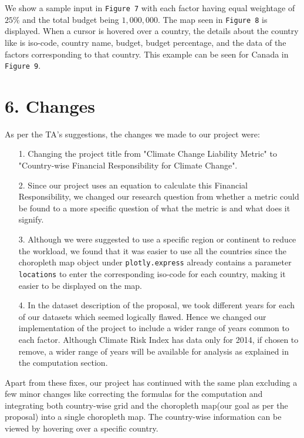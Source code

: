 \documentclass[fontsize=11pt]{article}
\begin{document}
    We show a sample input in \texttt{Figure 7} with each factor having equal weightage of $25\%$ and the total budget
    being $1,000,000$. The map seen in \texttt{Figure 8} is displayed. When a cursor is hovered over a country, the details about
    the country like is iso-code, country name, budget, budget percentage, and the data of the factors corresponding to that
    country. This example can be seen for Canada in \texttt{Figure 9}.\newline

    \section*{6. Changes}

    As per the TA's suggestions, the changes we made to our project were:
    \begin{enumerate}
        \item [1.] Changing the project title from "Climate Change Liability Metric" to "Country-wise Financial
                    Responsibility for Climate Change".
        \item [2.] Since our project uses an equation to calculate this Financial Responsibility, we changed our
                    research question from whether a metric could be found to a more specific question of what the
                    metric is and what does it signify.
        \item [3.] Although we were suggested to use a specific region or continent to reduce the workload, we found
                    that it was easier to use all the countries since the choropleth map object under \texttt{plotly.express}
                    already contains a parameter \texttt{locations} to enter the corresponding iso-code for each country,
                    making it easier to be displayed on the map.
        \item [4.] In the dataset description of the proposal, we took different years for each of our datasets which seemed logically flawed.
                    Hence we changed our implementation of the project to include a wider range of years common to each
                    factor. Although Climate Risk Index has data only for 2014, if chosen to remove, a wider range of
                    years will be available for analysis as explained in the computation section.
    \end{enumerate}
    Apart from these fixes, our project has continued with the same plan excluding a few minor changes like correcting the
    formulas for the computation and integrating both country-wise grid and the choropleth map(our goal as per the proposal)
    into a single choropleth map. The country-wise information can be viewed by hovering over a specific country. \newline
    
\end{document}

